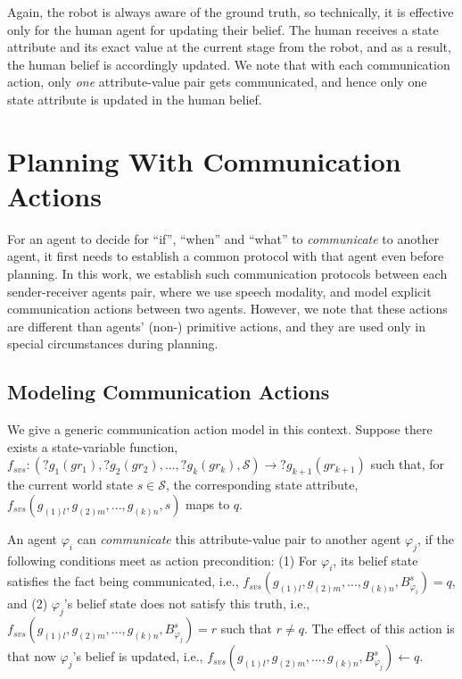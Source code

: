 \documentclass[letterpaper]{article} %
\begin{document}
Again, the robot is always aware of the ground truth, so technically, it is effective only for the human agent for updating their belief.
% 
The human receives a state attribute and its exact value at the current stage from the robot, and as a result, the human belief is accordingly updated. 
We note that with each communication action, only {\em one} attribute-value pair gets communicated, and hence only one state attribute is updated in the human belief.


\section{Planning With Communication Actions}
For an agent to decide for ``if'', ``when'' and ``what'' to \textit{communicate} to another agent, it first needs to establish a common protocol with that agent even before planning.  
In this work, we establish such communication protocols between each sender-receiver agents pair, where we use speech modality, and model explicit communication actions between two agents. 
However, we note that these actions are different than agents' (non-) primitive actions, and they are used only in special circumstances during planning.

\subsection{Modeling Communication Actions}
We give a generic communication action model in this context. 
% 
Suppose there exists a state-variable function, $f_{svs}:(?g_1 (gr_1), ?g_2 (gr_2), ..., ?g_k (gr_k),\mathcal{S}) \rightarrow ?g_{k+1} (gr_{k+1})$ such that,
for the current world state $s \in \mathcal{S}$, the corresponding state attribute, $f_{\textit{svs}}(g_{(1)l},g_{(2)m},...,g_{(k)n},s)$ maps to $q$.

An agent $\varphi_i$ can \textit{communicate} this attribute-value pair to another agent $\varphi_j$, if the following conditions meet as action precondition: 
(1) For $\varphi_i$, its belief state satisfies the fact being communicated, i.e.,
$f_{\textit{svs}}(g_{(1)l},g_{(2)m},...,g_{(k)n},B_{\varphi_i}^s) = q$, and (2) $\varphi_j$'s belief state does not satisfy this truth, i.e., $f_{\textit{svs}}(g_{(1)l},g_{(2)m},...,g_{(k)n},B_{\varphi_j}^s) = r$ such that $r \neq q$.
The effect of this action is that now 
$\varphi_j$'s belief is updated, i.e., $f_{\textit{svs}}(g_{(1)l},g_{(2)m},...,g_{(k)n},B_{\varphi_j}^s) \leftarrow q$. 
\end{document}

